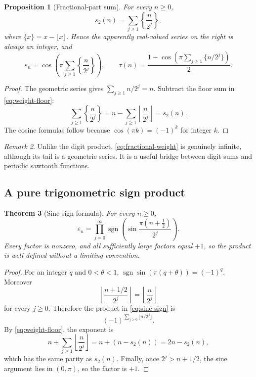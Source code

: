 \documentclass[11pt,oneside]{article}
\newtheorem{theorem}{Theorem}[section]
\newtheorem{proposition}[theorem]{Proposition}
\theoremstyle{definition}
\theoremstyle{remark}
\newtheorem{remark}[theorem]{Remark}
\newcommand{\swt}{s_2}
\newcommand{\sgn}{\operatorname{sgn}}
\newcommand{\eps}{\varepsilon}
\newcommand{\1}{\mathbf 1}
\begin{document}
\begin{proposition}[Fractional-part sum]
\label{prop:fractional-weight}
For every \(n\ge0\),
\begin{equation}
 \boxed{\swt(n)=\sum_{j\ge1}\left\{\frac{n}{2^j}\right\}},
 \label{eq:fractional-weight}
\end{equation}
where \(\{x\}=x-\lfloor x\rfloor\).  Hence the apparently real-valued series on the right is
always an integer, and
\begin{equation}
 \eps_n=\cos\!\left(\pi\sum_{j\ge1}\left\{\frac n{2^j}\right\}\right),
 \qquad
 \tau(n)=\frac{1-\cos\!\left(\pi\sum_{j\ge1}\{n/2^j\}\right)}2.
 \label{eq:fractional-cos}
\end{equation}
\end{proposition}

\begin{proof}
The geometric series gives \(\sum_{j\ge1}n/2^j=n\).  Subtract the floor sum in
\eqref{eq:weight-floor}:
\[
 \sum_{j\ge1}\left\{\frac n{2^j}\right\}
 =n-\sum_{j\ge1}\left\lfloor\frac n{2^j}\right\rfloor
 =\swt(n).
\]
The cosine formulas follow because \(\cos(\pi k)=(-1)^k\) for integer \(k\).
\end{proof}

\begin{remark}
Unlike the digit product, \eqref{eq:fractional-weight} is genuinely infinite, although its
tail is a geometric series.  It is a useful bridge between digit sums and periodic
sawtooth functions.
\end{remark}

\subsection{A pure trigonometric sign product}

\begin{theorem}[Sine-sign formula]
\label{thm:sine-sign}
For every \(n\ge0\),
\begin{equation}
 \boxed{
 \eps_n=
 \prod_{j=0}^{\infty}
 \sgn\!\left(\sin\!\frac{\pi(n+\tfrac12)}{2^j}\right).}
 \label{eq:sine-sign}
\end{equation}
Every factor is nonzero, and all sufficiently large factors equal \(+1\), so the product is
well defined without a limiting convention.
\end{theorem}

\begin{proof}
For an integer \(q\) and \(0<\theta<1\),
\(\sgn\sin(\pi(q+\theta))=(-1)^q\).  Moreover
\[
 \left\lfloor\frac{n+1/2}{2^j}\right\rfloor
 =\left\lfloor\frac n{2^j}\right\rfloor
\]
for every \(j\ge0\).  Therefore the product in \eqref{eq:sine-sign} is
\[
 (-1)^{\sum_{j\ge0}\lfloor n/2^j\rfloor}.
\]
By \eqref{eq:weight-floor}, the exponent is
\[
 n+\sum_{j\ge1}\left\lfloor\frac n{2^j}\right\rfloor
 =n+(n-\swt(n))=2n-\swt(n),
\]
which has the same parity as \(\swt(n)\).  Finally, once \(2^j>n+1/2\), the sine argument lies
in \((0,\pi)\), so the factor is \(+1\).
\end{proof}
\end{document}
